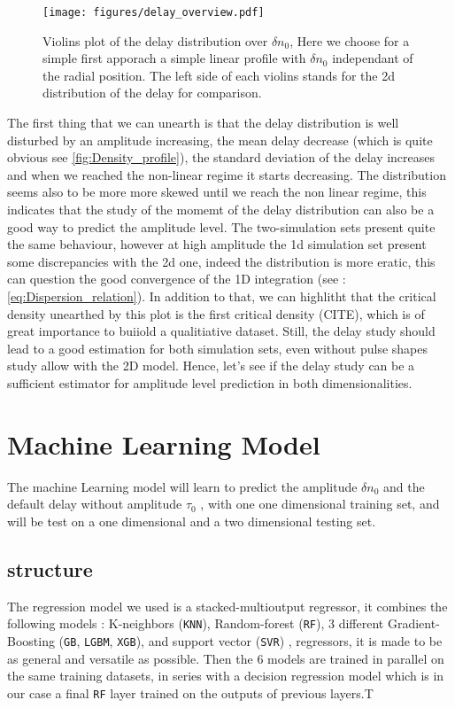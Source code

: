 \documentclass[11pt,a4paper,openany]{report}
\begin{document}
\begin{multicols}{2}
    \begin{figure}[H]
        \centering
        \texttt{[image: figures/delay\_overview.pdf]}
        \caption{Violins plot of the delay distribution over $\delta n_0$, Here we choose for a simple first apporach a simple linear profile with $\delta n_0$ independant of the radial position. The left side of each violins stands for the 2d distribution of the delay for comparison.}
        \label{fig:Violins_delay}
    \end{figure}
    The first thing that we can unearth is that the delay distribution is well disturbed by an amplitude increasing, the mean delay decrease (which is quite obvious see \ref{fig:Density_profile}), the standard deviation of the delay increases and when we reached the non-linear regime it starts decreasing. The distribution seems also to be more more skewed until we reach the non linear regime, this indicates that the study of the momemt of the delay distribution can also be a good way to predict the amplitude level. The two-simulation sets present quite the same behaviour, however at high amplitude the 1d simulation set present some discrepancies with the 2d one, indeed the distribution is more eratic, this can question the good convergence of the 1D integration (see : \ref{eq:Dispersion_relation}). In addition to that, we can highlitht that the critical density unearthed by this plot is the first critical density (CITE), which is of great importance to buiiold a qualitiative dataset. Still, the delay study should lead to a good estimation for both simulation sets, even without pulse shapes study allow with the 2D model.
    Hence, let's see if the delay study can be a sufficient estimator for amplitude level prediction in both dimensionalities.

    \section{Machine Learning Model}
    The machine Learning model will learn to predict the amplitude $\delta n_0 $ and the default delay without amplitude $\tau_0 $ , with one one dimensional training set, and will be test on a one dimensional and a two dimensional testing set.
    \subsection{structure}

    The regression model we used is a stacked-multioutput regressor, it combines the following models : K-neighbors (\texttt{KNN}), Random-forest (\texttt{RF}), 3 different Gradient-Boosting (\texttt{GB}, \texttt{LGBM}, \texttt{XGB}), and support vector (\texttt{SVR}) , regressors, it is made to be as general and versatile as possible. Then the 6 models are trained in parallel on the same training datasets, in series with a decision regression model which is in our case a final \texttt{RF} layer trained on the outputs of previous layers.T


\end{multicols}
\end{document}
